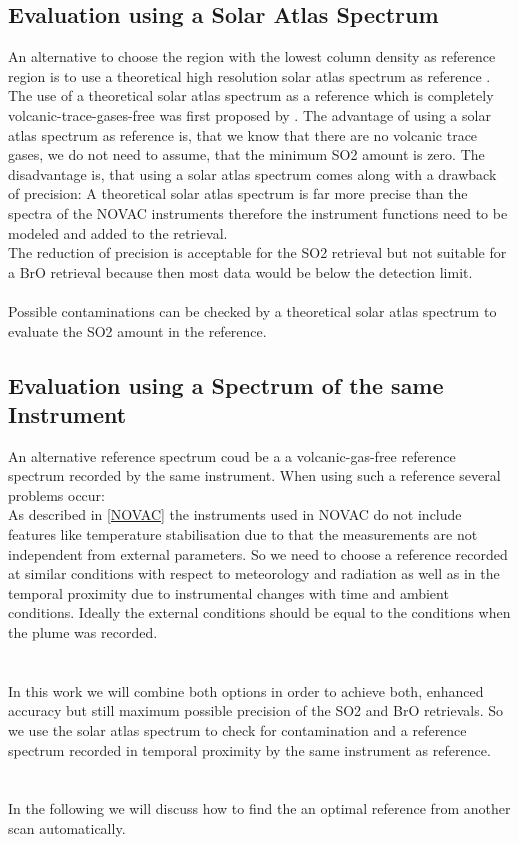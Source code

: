 \documentclass  [
  paper    = a4,
  BCOR     = 10mm,
  twoside,
  fontsize = 12pt,
  fleqn,
  toc      = bibnumbered,
  toc      = listofnumbered,
  numbers  = noendperiod,
  headings = normal,
  listof   = leveldown,
  version  = 3.03
]                                       {scrreprt}
\begin{document}
	\subsection*{Evaluation using a Solar Atlas Spectrum \label{kuruz}}
	An alternative to choose the region with the lowest column density as reference region is to use a theoretical high resolution solar atlas spectrum as reference \cite{chance2010improved}.
	The use of a theoretical solar atlas spectrum as a reference which is completely volcanic-trace-gases-free was first proposed by \cite{lubcke2014bro}.
	The advantage of using a solar atlas spectrum as reference is, that we know that there are no volcanic trace gases, we do not need to assume, that the minimum SO2 amount is zero. The disadvantage is, that using a solar atlas spectrum comes along with a drawback of precision: A theoretical solar atlas spectrum is far more precise than the spectra of the NOVAC instruments therefore the instrument functions need to be modeled and added to the retrieval.\\ 
	The reduction of precision is acceptable for the
	SO2 retrieval but not suitable for a BrO retrieval because then most data would be below the detection limit.\\
%
\\
%
	Possible contaminations can be checked
	by a theoretical solar atlas spectrum to evaluate the SO2 amount in the reference.

	\subsection*{Evaluation using a Spectrum of the same Instrument}
	An alternative reference spectrum coud be a a volcanic-gas-free reference
	spectrum recorded by the same instrument. When using such a reference several problems occur:\\
	As described in \cref{NOVAC} the instruments used in NOVAC do not include features like temperature stabilisation due to that the measurements are not independent from external parameters. 
	So we need to choose a reference recorded at similar conditions with respect to meteorology and	radiation as well as in the temporal proximity due to instrumental changes with time and ambient conditions. Ideally the external conditions should be equal to the conditions when the plume was recorded.\\
	\\
	\\
	In this work we will combine both options in order to
	achieve both, enhanced accuracy but still maximum possible precision of
	the SO2 and BrO retrievals. So we use the solar atlas spectrum to check for 
	contamination and a reference spectrum recorded in temporal proximity by the same instrument as reference.\\
	\\
	\\
	In the following we will discuss how to find the an optimal reference from another scan automatically.
	
\end{document}
